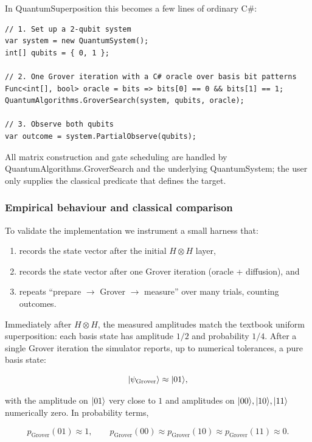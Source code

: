 \documentclass[a4paper,11pt]{article}
\begin{document}
In QuantumSuperposition this becomes a few lines of ordinary C\#:

\begin{lstlisting}[style=codeblock]
// 1. Set up a 2-qubit system
var system = new QuantumSystem();
int[] qubits = { 0, 1 };

// 2. One Grover iteration with a C# oracle over basis bit patterns
Func<int[], bool> oracle = bits => bits[0] == 0 && bits[1] == 1;
QuantumAlgorithms.GroverSearch(system, qubits, oracle);

// 3. Observe both qubits
var outcome = system.PartialObserve(qubits);
\end{lstlisting}

All matrix construction and gate scheduling are handled by QuantumAlgorithms.GroverSearch and the underlying QuantumSystem; the user only supplies the classical predicate that defines the target.

\subsubsection{Empirical behaviour and classical comparison}

To validate the implementation we instrument a small harness that:

\begin{enumerate}
\item records the state vector after the initial \(H \otimes H\) layer,
\item records the state vector after one Grover iteration (oracle + diffusion), and
\item repeats ``prepare \(\rightarrow\) Grover \(\rightarrow\) measure'' over many trials, counting outcomes.
\end{enumerate}

Immediately after \(H \otimes H\), the measured amplitudes match the textbook uniform superposition:
each basis state has amplitude \(1/2\) and probability \(1/4\). After a single Grover iteration the simulator reports, up to numerical tolerances, a pure basis state:

\[
  \lvert \psi_{\mathrm{Grover}} \rangle
  \approx \lvert 01 \rangle,
\]

with the amplitude on \(\lvert 01 \rangle\) very close to \(1\) and amplitudes on \(\lvert 00 \rangle, \lvert 10 \rangle, \lvert 11 \rangle\) numerically zero. In probability terms,

\[
  p_{\mathrm{Grover}}(01) \approx 1,\qquad
  p_{\mathrm{Grover}}(00) \approx
  p_{\mathrm{Grover}}(10) \approx
  p_{\mathrm{Grover}}(11) \approx 0.
\]
\end{document}
